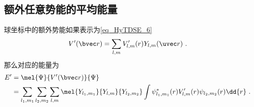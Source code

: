 \subsection{额外任意势能的平均能量}
球坐标中的额外势能如果表示为\autoref{eq_HyTDSE_6} 
\begin{equation}
V'(\bvec r) = \sum_{l,m} V'_{l,m}(r) Y_{l,m}(\uvec r)~.
\end{equation}
那么对应的能量为
\begin{equation}\label{eq_Hanaly_3}
\begin{aligned}
E' &= \mel{\Psi}{V'(\bvec r)}{\Psi}\\
&= \sum_{l_1,m_1}\sum_{l_2,m_2}\sum_{l,m} \mel{Y_{l_1,m_1}}{Y_{l,m}}{Y_{l_2,m_2}} \int \psi_{l_1,m_1}^*(r) V'_{l,m}(r) \psi_{l_2,m_2}(r) \dd{r}~.
\end{aligned}
\end{equation}
